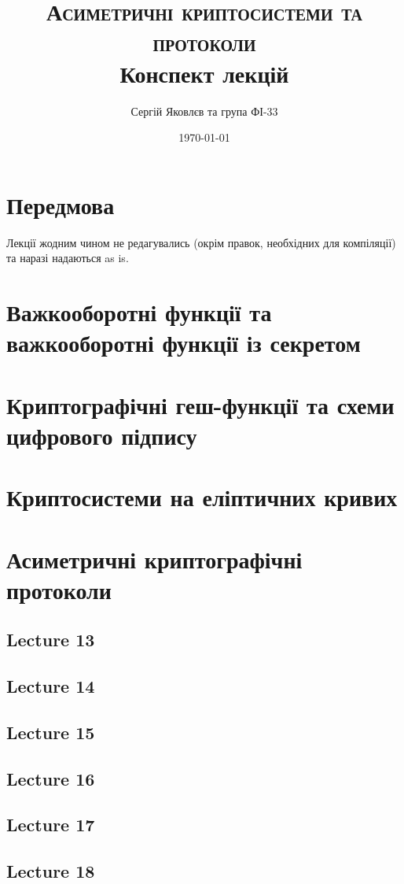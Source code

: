 \documentclass[12pt]{report}
\title{\textsc{Асиметричні криптосистеми та протоколи} \\ Конспект лекцій}
\author{Сергій Яковлєв та група ФІ-33}
\date{\today}
\theoremstyle{plain}
\theoremstyle{definition}
\theoremstyle{remark}
\begin{document}
\maketitle
\tableofcontents
\clearpage

\chapter*{Передмова}

Лекції жодним чином не редагувались (окрім правок, необхідних для компіляції) та наразі надаються as is.

\chapter{Важкооборотні функції та важкооборотні функції із секретом}


\chapter{Криптографічні геш-функції та схеми цифрового підпису}


\chapter{Криптосистеми на еліптичних кривих}


\chapter{Асиметричні криптографічні протоколи}

\section{Lecture 13}
\section{Lecture 14}
\section{Lecture 15}
\section{Lecture 16}
\section{Lecture 17}
\section{Lecture 18}
\end{document}
